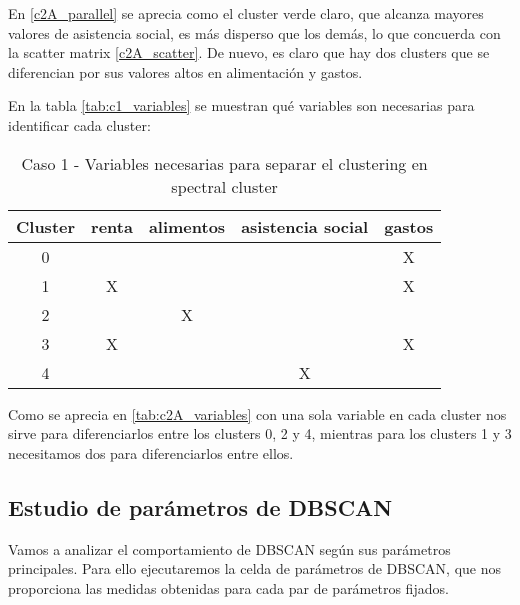 En \eqref{c2A_parallel} se aprecia como el cluster verde claro, que alcanza mayores valores de asistencia social, es más disperso que los demás, lo que concuerda con la scatter matrix \eqref{c2A_scatter}. De nuevo, es claro que hay dos clusters que se diferencian por sus valores altos en alimentación y gastos.

En la tabla  \eqref{tab:c1_variables} se muestran qué variables son necesarias para identificar cada cluster:

\begin{table}[H]
\centering
\caption{Caso 1 - Variables necesarias para separar el clustering en spectral cluster}
\label{tab:c2A_variables}
\begin{tabular}{ccccc}
\toprule
 Cluster & renta & alimentos & asistencia social & gastos \\
\midrule
0 & & & & X \\
1 & X & & & X \\
2 & & X & & \\
3 & X & & & X \\
4 & & & X & \\
\bottomrule
\end{tabular}
\end{table}
Como se aprecia en \eqref{tab:c2A_variables} con una sola variable en cada cluster nos sirve para diferenciarlos entre los clusters 0, 2 y 4, mientras para los clusters 1 y 3 necesitamos dos para diferenciarlos entre ellos.

\subsection{Estudio de parámetros de DBSCAN}

Vamos a analizar el comportamiento de DBSCAN según sus parámetros principales. Para ello ejecutaremos la celda de parámetros de DBSCAN, que nos proporciona las medidas obtenidas para cada par de parámetros fijados.

